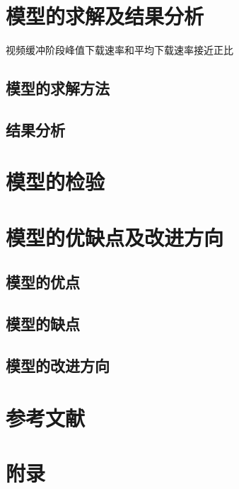 \documentclass[UTF8]{ctexart}
\begin{document}
\section{模型的求解及结果分析}

视频缓冲阶段峰值下载速率和平均下载速率接近正比

\subsection{模型的求解方法}
\subsection{结果分析}

\section{模型的检验}
\section{模型的优缺点及改进方向}
\subsection{模型的优点}
\subsection{模型的缺点}
\subsection{模型的改进方向}
\section{参考文献}
\section{附录}
\end{document}

